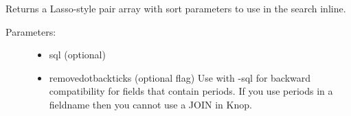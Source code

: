 \documentclass[letterpaper,10pt,english]{sphinxmanual}
\begin{document}
\begin{fulllineitems}
\begin{fulllineitems}
\end{fulllineitems}


\begin{fulllineitems}
\label{knop_grid:knop_grid.sortfield}
\end{fulllineitems}



\begin{fulllineitems}
\end{fulllineitems}


\begin{fulllineitems}
\label{knop_grid:knop_grid.sortparams}
\end{fulllineitems}


\begin{fulllineitems}
Returns a Lasso-style pair array with sort parameters to use in the search inline.
\begin{description}
\item[{Parameters:}] \leavevmode\begin{itemize}
\item {} 
sql (optional)

\item {} 
removedotbackticks (optional flag)
Use with -sql for backward compatibility for fields that contain periods.
If you use periods in a fieldname then you cannot use a JOIN in Knop.

\end{itemize}

\end{description}

\end{fulllineitems}


\begin{fulllineitems}
\label{knop_grid:knop_grid.tbl_id}
\end{fulllineitems}




\end{fulllineitems}
\end{document}
